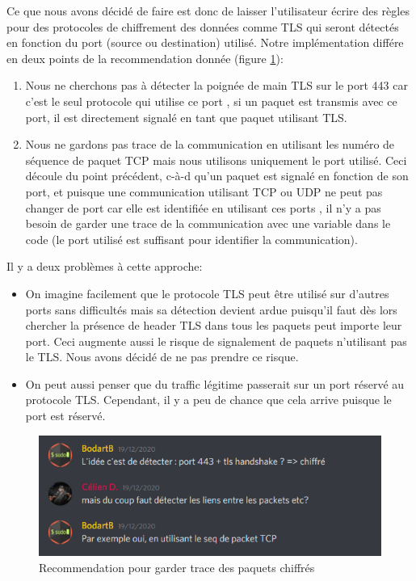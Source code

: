 \documentclass[a4paper]{article}
\begin{document}
Ce que nous avons décidé de faire est donc de laisser l'utilisateur écrire des règles pour des protocoles de chiffrement des données comme TLS qui seront détectés en fonction du port (source ou destination) utilisé. Notre implémentation différe en deux points de la recommendation donnée (figure \ref{fig:tls01}):
\begin{enumerate}
    \item Nous ne cherchons pas à détecter la poignée de main TLS sur le port 443 car c'est le seul protocole qui utilise ce port \cite{5}, si un paquet est transmis avec ce port, il est directement signalé en tant que paquet utilisant TLS.
    \item Nous ne gardons pas trace de la communication en utilisant les numéro de séquence de paquet TCP mais nous utilisons uniquement le port utilisé. Ceci découle du point précédent, c-à-d qu'un paquet est signalé en fonction de son port, et puisque une communication utilisant TCP ou UDP ne peut pas changer de port car elle est identifiée en utilisant ces ports \cite{4}, il n'y a pas besoin de garder une trace de la communication avec une variable dans le code (le port utilisé est suffisant pour identifier la communication).
\end{enumerate}
Il y a deux problèmes à cette approche:
\begin{itemize}
    \item On imagine facilement que le protocole TLS peut être utilisé sur d'autres ports sans difficultés mais sa détection devient ardue puisqu'il faut dès lors chercher la présence de header TLS dans tous les paquets peut importe leur port. Ceci augmente aussi le risque de signalement de paquets n'utilisant pas le TLS. Nous avons décidé de ne pas prendre ce risque.
    \item On peut aussi penser que du traffic légitime passerait sur un port réservé au protocole TLS. Cependant, il y a peu de chance que cela arrive puisque le port est réservé.
\end{itemize}

\begin{figure}[H]
    \centering
    \includegraphics[width=0.75\linewidth]{images/tls-01.PNG}
    \caption{Recommendation pour garder trace des paquets chiffrés}
    \label{fig:tls01}
\end{figure}
\end{document}

